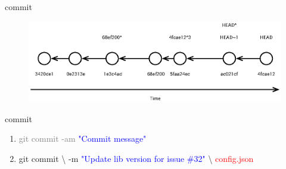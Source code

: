 \documentclass{beamer}
\begin{document}
\begin{frame}{commit}
    \begin{figure}
        \center
        \includegraphics[width=.9\textwidth]{git-commit-flow}
        \label{fig:git-commit-flow}
    \end{figure}
\end{frame}

\begin{frame}{commit}
    \begin{enumerate}[\$]
        \item<1-> \Large{\textcolor<3->{gray}{git commit -am \textcolor<2>{blue}{"Commit message"}}}
        \item<3-> \Large{git commit {\textbackslash}\newline 
            -m \textcolor<4->{blue}{"Update lib version for issue \#32"} {\textbackslash}\newline 
            \textcolor<5->{red}{config.json}}
    \end{enumerate}
\end{frame}
\end{document}

